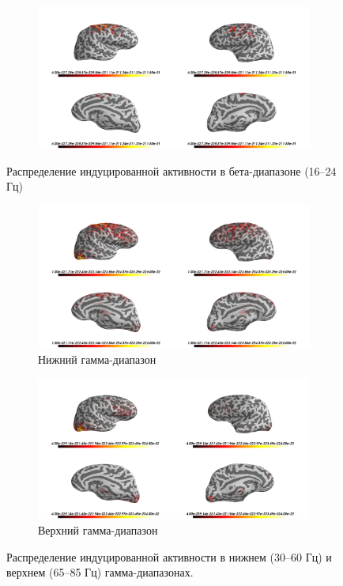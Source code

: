 \begin{figure}
    \begin{subfigure}[b]{1\textwidth}
    \includegraphics[width=\textwidth]{../images/psiicos_paper/Figure17_hr.jpg}
    \end{subfigure}
    \caption{Распределение индуцированной активности в бета-диапазоне (16--24 Гц)}\label{fig:beta_pwr}
\end{figure} %

\begin{figure}
    \begin{subfigure}[b]{0.5\textwidth}
        \includegraphics[width=\textwidth]{../images/psiicos_paper/Figure18a_hr.jpg}
        \caption{Нижний гамма-диапазон}\label{fig:lgama_pwr}
    \end{subfigure}
    \begin{subfigure}[b]{0.5\textwidth}
        \includegraphics[width=0.99\textwidth]{../images/psiicos_paper/Figure18b_hr.jpg}
        \caption{Верхний гамма-диапазон}\label{fig:gama_pwr}
    \end{subfigure}
    \caption{Распределение индуцированной активности в нижнем (30--60 Гц) и верхнем (65--85 Гц) гамма-диапазонах.}\label{fig:gamma_pwr}
\end{figure} %
